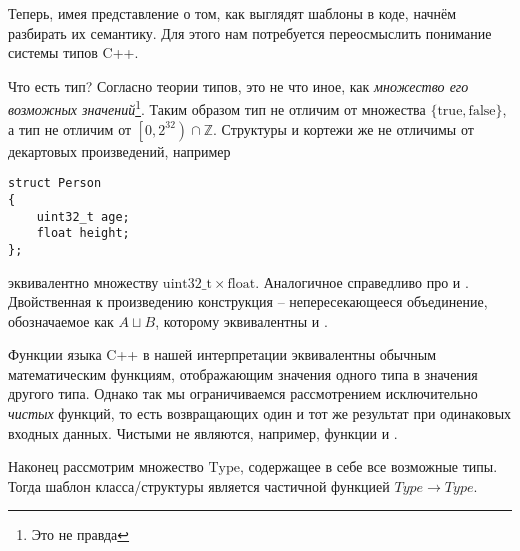 Теперь, имея представление о том, как выглядят шаблоны в коде, начнём разбирать их семантику. Для этого нам потребуется переосмыслить понимание системы типов C++.

Что есть тип? Согласно теории типов, это не что иное, как \textit{множество его возможных значений}\footnote{Это не правда}. Таким образом тип  не отличим от множества $\{\mathrm{true}, \mathrm{false}\}$, а тип  не отличим от $\left[0, 2^{32}\right) \cap \mathbb{Z}$. Структуры и кортежи же не отличимы от декартовых произведений, например
\begin{verbatim}
struct Person
{
    uint32_t age;
    float height;
};
\end{verbatim}
эквивалентно множеству $\mathrm{uint32\_t} \times \mathrm{float}$. Аналогичное справедливо про  и . Двойственная к произведению конструкция -- непересекающееся объединение, обозначаемое как $A \sqcup B$, которому эквивалентны  и .

Функции языка C++ в нашей интерпретации эквивалентны обычным математическим функциям, отображающим значения одного типа в значения другого типа. Однако так мы ограничиваемся рассмотрением исключительно \textit{чистых} функций, то есть возвращающих один и тот же результат при одинаковых входных данных. Чистыми не являются, например, функции  и .

Наконец рассмотрим множество $\mathrm{Type}$, содержащее в себе все возможные типы. Тогда шаблон класса/структуры является частичной функцией $Type \to Type$. 



